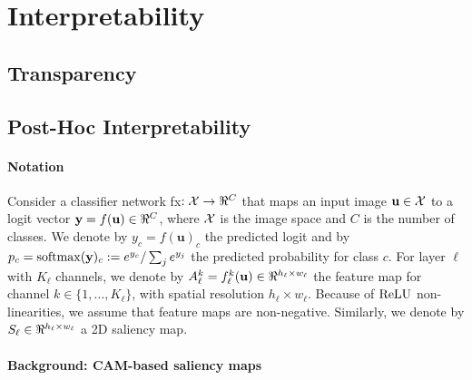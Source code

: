 \section{Interpretability}
\label{rel:sec_int}


\subsection{Transparency}
\label{rel:sub_transp}

\subsection{Post-Hoc Interpretability}
\label{rel:sub_post}

\paragraph{Notation}
\label{sec:oc_notation}

Consider a classifier network \gls{fx}$: \cX \to \real^C$ that maps an input image $\mathbf{u} \in \mathcal{X}$ to a 
logit vector $\vy = f(\mathbf{u}) \in \real^C$, where $\mathcal{X}$ is the image space and $C$ is the number 
of classes. We denote by $y_c = f(\mathbf{u})_c$ the predicted logit and by $p_c = \operatorname{softmax}(\mathbf{y})_c 
\mathrel{:=} e^{y_c} / \sum_j e^{y_j}$ the predicted probability for class $c$. For layer $\ell$ 
with $K_\ell$ channels, we denote by $A^k_\ell = f^k_\ell(\mathbf{u}) \in \real^{h_\ell \times w_\ell}$ 
the feature map for channel $k \in \{1,\dots,K_\ell\}$, with spatial resolution $h_\ell \times 
w_\ell$. Because of ${\operatorname{ReLU}}$ non-linearities, we assume that feature maps are non-negative. 
Similarly, we denote by $S_\ell \in \real^{h_\ell \times w_\ell}$ a 2D saliency map.


\paragraph{Background: CAM-based saliency maps}
\label{sec:oc_back}

